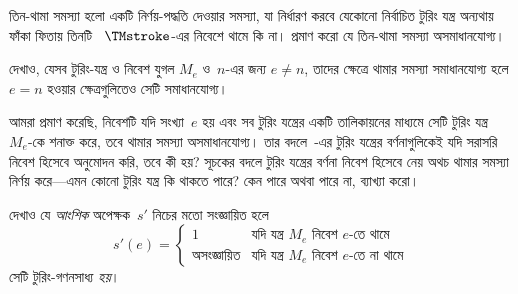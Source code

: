 \documentclass[../../../include/open-logic-section]{subfiles}
\begin{document}
\begin{prob}
তিন-থামা সমস্যা হলো একটি নির্ণয়-পদ্ধতি দেওয়ার সমস্যা, যা
নির্ধারণ করবে যেকোনো নির্বাচিত টুরিং যন্ত্র অন্যথায় ফাঁকা ফিতায় তিনটি
~$\TMstroke$-এর নিবেশে থামে কি না। প্রমাণ করো যে তিন-থামা সমস্যা
অসমাধানযোগ্য।
\end{prob}

\begin{prob}
দেখাও, যেসব টুরিং-যন্ত্র ও নিবেশ যুগল $M_e$ ও~$n$-এর জন্য $e \neq n$,
তাদের ক্ষেত্রে থামার সমস্যা সমাধানযোগ্য হলে $e = n$ হওয়ার ক্ষেত্রগুলিতেও
সেটি সমাধানযোগ্য।
\end{prob}

\begin{prob}
আমরা প্রমাণ করেছি, নিবেশটি যদি সংখ্যা~$e$ হয় এবং সব টুরিং যন্ত্রের একটি
তালিকায়নের মাধ্যমে সেটি টুরিং যন্ত্র~$M_e$-কে শনাক্ত করে, তবে থামার সমস্যা
অসমাধানযোগ্য। তার বদলে~-এর টুরিং যন্ত্রের
বর্ণনাগুলিকেই যদি সরাসরি নিবেশ হিসেবে অনুমোদন করি, তবে কী হয়? সূচকের
বদলে টুরিং যন্ত্রের বর্ণনা নিবেশ হিসেবে নেয় অথচ থামার সমস্যা নির্ণয়
করে—এমন কোনো টুরিং যন্ত্র কি থাকতে পারে? কেন পারে অথবা পারে না, ব্যাখ্যা
করো।
\end{prob}

\begin{prob} দেখাও যে \emph{আংশিক} অপেক্ষক~$s'$ নিচের মতো সংজ্ঞায়িত হলে
  \[
  s'(e) =
  \begin{cases}
    \text{1} & \text{যদি যন্ত্র~$M_e$ নিবেশ $e$-তে থামে}\\
    \text{অসংজ্ঞায়িত} & \text{যদি যন্ত্র~$M_e$ নিবেশ $e$-তে না থামে}
  \end{cases}
  \]
  সেটি টুরিং-গণনসাধ্য \emph{হয়}।
\end{prob}
\end{document}
